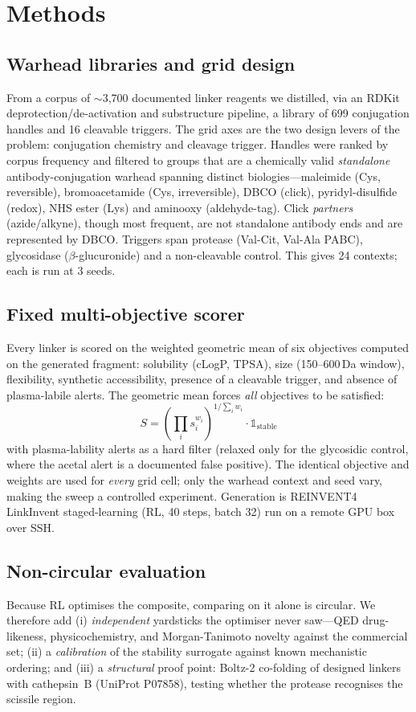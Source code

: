 \documentclass[10pt]{article}
\begin{document}
\section{Methods}
\subsection{Warhead libraries and grid design}
From a corpus of $\sim$3{,}700 documented linker reagents we distilled, via an RDKit deprotection/de-activation and substructure pipeline, a library of 699 conjugation handles and 16 cleavable triggers. The grid axes are the two design levers of the problem: conjugation chemistry and cleavage trigger. Handles were ranked by corpus frequency and filtered to groups that are a chemically valid \emph{standalone} antibody-conjugation warhead spanning distinct biologies---maleimide (Cys, reversible), bromoacetamide (Cys, irreversible), DBCO (click), pyridyl-disulfide (redox), NHS ester (Lys) and aminooxy (aldehyde-tag). Click \emph{partners} (azide/alkyne), though most frequent, are not standalone antibody ends and are represented by DBCO. Triggers span protease (Val-Cit, Val-Ala PABC), glycosidase ($\beta$-glucuronide) and a non-cleavable control. This gives 24 contexts; each is run at 3 seeds.
\subsection{Fixed multi-objective scorer}
Every linker is scored on the weighted geometric mean of six objectives computed on the generated fragment: solubility (cLogP, TPSA), size (150--600\,Da window), flexibility, synthetic accessibility, presence of a cleavable trigger, and absence of plasma-labile alerts. The geometric mean forces \emph{all} objectives to be satisfied:
\begin{equation} S = \left(\prod_i s_i^{w_i}\right)^{1/\sum_i w_i}\cdot\mathbb{1}_{\text{stable}} \end{equation}
with plasma-lability alerts as a hard filter (relaxed only for the glycosidic control, where the acetal alert is a documented false positive). The identical objective and weights are used for \emph{every} grid cell; only the warhead context and seed vary, making the sweep a controlled experiment. Generation is REINVENT4 LinkInvent staged-learning (RL, 40 steps, batch 32) run on a remote GPU box over SSH.
\subsection{Non-circular evaluation}
Because RL optimises the composite, comparing on it alone is circular. We therefore add (i) \emph{independent} yardsticks the optimiser never saw---QED drug-likeness, physicochemistry, and Morgan-Tanimoto novelty against the commercial set; (ii) a \emph{calibration} of the stability surrogate against known mechanistic ordering; and (iii) a \emph{structural} proof point: Boltz-2 co-folding of designed linkers with cathepsin~B (UniProt P07858), testing whether the protease recognises the scissile region.
\end{document}
